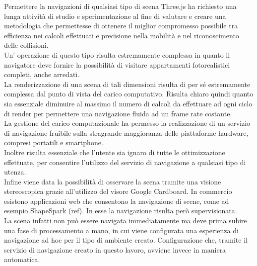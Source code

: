 Permettere la navigazioni di qualsiasi tipo di scena Three.js ha richiesto una lunga attività di studio e sperimentazione al fine di valutare e creare una metodologia che permettesse di ottenere il miglior compromesso possibile tra efficienza nei calcoli effettuati e precisione nella mobilità e nel riconoscimento delle collisioni. 
\\
Un’ operazione di questo tipo risulta estremamente complessa in quanto il navigatore deve fornire la possibilità di visitare appartamenti fotorealistici completi, anche arredati.
\\
La renderizzazione di una scena di tali dimensioni risulta di per sé estremamente complessa dal punto di vista del carico computativo. Risulta chiaro quindi quanto sia essenziale diminuire al massimo il numero di calcoli da effettuare ad ogni ciclo di render per permettere una navigazione fluida ad un frame rate costante. 
\\
La gestione del carico computazionale ha permesso la realizzazione di un servizio di navigazione fruibile sulla stragrande maggioranza delle piattaforme hardware, compresi portatili e smartphone.
\\
Inoltre risulta essenziale che l’utente sia ignaro di tutte le ottimizzazione effettuate, per consentire l’utilizzo del servizio di navigazione a qualsiasi tipo di utenza. 
\\
Infine viene data la possibilità di osservare la scena tramite una visione stereoscopica grazie all’utilizzo del visore Google Cardboard.
In commercio esistono applicazioni web che consentono la navigazione di scene, come ad esempio ShapeSpark (ref). In esse la navigazione risulta però supervisionata.
\\
La scena infatti non può essere navigata immediatamente ma deve prima subire una fase di processamento a mano, in cui viene configurata una esperienza di navigazione ad hoc per il tipo di ambiente creato. 
Configurazione che, tramite il servizio di navigazione creato in questo lavoro, avviene invece in maniera automatica.